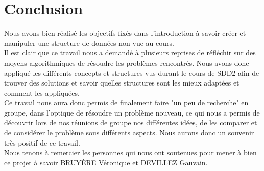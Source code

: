\documentclass[10pt,a4paper]{article}
\begin{document}
\newpage
\section{Conclusion}
Nous avons bien réalisé les objectifs fixés dans l'introduction à savoir créer et manipuler une structure de données non vue au cours.\\Il est clair que ce travail nous a demandé à plusieurs reprises de réfléchir sur des moyens algorithmiques de résoudre les problèmes rencontrés. Nous avons donc appliqué les différents concepts et structures vus durant le cours de SDD2 afin de trouver des solutions et savoir quelles structures sont les mieux adaptées et comment les appliquées.\\
Ce travail nous aura donc permis de finalement faire "un peu de recherche" en groupe, dans l'optique de résoudre un problème nouveau, ce qui nous a permis de découvrir lors de nos réunions de groupe nos différentes idées, de les comparer et de considérer le problème sous différents aspects. Nous aurons donc un souvenir très positif de ce travail.\\   
Nous tenons à remercier les personnes qui nous ont soutenues pour mener à bien ce projet à savoir BRUYÈRE Véronique et DEVILLEZ Gauvain.
\end{document}
